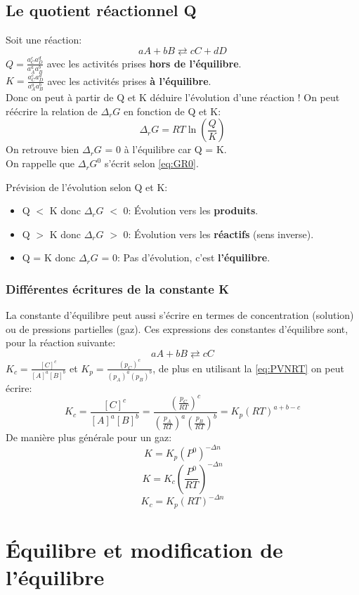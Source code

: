 \documentclass[10pt,a4paper]{book}
\begin{document}
\subsection{Le quotient réactionnel Q}
Soit une réaction:
\[aA + bB \rightleftarrows cC + dD\]
\(Q = \frac{a_C^c a_D^d}{a_A^a a_B^b}\) avec les activités prises \textbf{hors de l'équilibre}. \\
\(K = \frac{a_C^c a_D^d}{a_A^a a_B^b}\) avec les activités prises \textbf{à l'équilibre}. \\
Donc on peut à partir de Q et K déduire l'évolution d'une réaction ! On peut réécrire la relation de $\Delta_rG$ en fonction de Q et K: 
\[\Delta_rG = RT\ln(\frac{Q}{K})\]
On retrouve bien $\Delta_rG$ = 0 à l'équilibre car Q = K. \\
On rappelle que $\Delta_rG^0$ s'écrit selon \ref{eq:GR0}. \\ \par
Prévision de l'évolution selon Q et K:
\begin{itemize}
\item Q $<$ K donc $\Delta_rG$ $<$ 0: Évolution vers les \textbf{produits}.
\item Q $>$ K donc $\Delta_rG$ $>$ 0: Évolution vers les \textbf{réactifs} (sens inverse).
\item Q = K donc $\Delta_rG$ = 0: Pas d'évolution, c'est \textbf{l'équilibre}.
\end{itemize}

\subsubsection{Différentes écritures de la constante K}

La constante d'équilibre peut aussi s'écrire en termes de concentration (solution) ou de
pressions partielles (gaz). Ces expressions des constantes d'équilibre sont, pour la réaction suivante: 
\[aA + bB \rightleftarrows cC\]
\(K_c = \frac{[C]^c}{[A]^a[B]^b}\) et \(K_p = \frac{(p_C)^c}{(p_A)^a(p_B)^b}\), de plus en utilisant la \ref{eq:PVNRT} on peut écrire:
\[K_c = \frac{[C]^c}{[A]^a[B]^b} = \frac{(\frac{p_C}{RT})^c}{(\frac{p_A}{RT})^a(\frac{p_B}{RT})^b} = K_p(RT)^{a+b-c}\]
De manière plus générale pour un gaz:
\[K = K_p(P^0)^{-\Delta n}\]
\[K = K_c(\frac{P^0}{RT})^{-\Delta n}\]
\[K_c = K_p(RT)^{-\Delta n}\]

\section{Équilibre et modification de l'équilibre}
\end{document}
